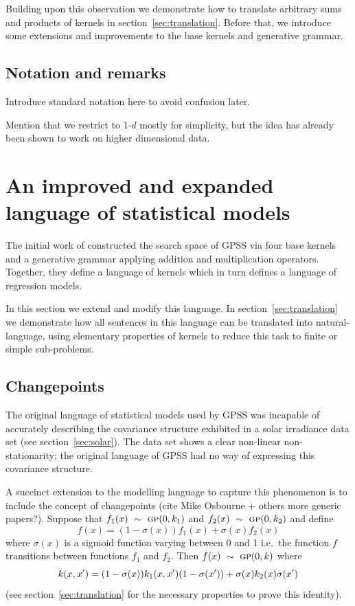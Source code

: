 \documentclass{article}
\def\ie{i.e.\ }
\begin{document}
Building upon this observation we demonstrate how to translate arbitrary sums and products of kernels in section~\ref{sec:translation}.
Before that, we introduce some extensions and improvements to the base kernels and generative grammar.

\subsection{Notation and remarks}

Introduce standard notation here to avoid confusion later.

Mention that we restrict to 1-$d$ mostly for simplicity, but the idea has already been shown to work on higher dimensional data.

\section{An improved and expanded language of statistical models}
\label{sec:improvements}

The initial work of \cite{DuvLloGroetal13} constructed the search space of GPSS via four base kernels and a generative grammar applying addition and multiplication operators.
Together, they define a language of kernels which in turn defines a language of regression models.

In this section we extend and modify this language.
In section~\ref{sec:translation} we demonstrate how all sentences in this language can be translated into natural-language, using elementary properties of kernels to reduce this task to finite or simple sub-problems.

\subsection{Changepoints}

The original language of statistical models used by GPSS was incapable of accurately describing the covariance structure exhibited in a solar irradiance data set (see section~\ref{sec:solar}).
The data set shows a clear non-linear non-stationarity; the original language of GPSS had no way of expressing this covariance structure.

A succinct extension to the modelling language to capture this phenomenon is to include the concept of changepoints (cite Mike Osbourne + others more generic papers?).
Suppose that $f_1(x) \ \sim\  {\textsc{gp}}{}(0, k_1)$ and $f_2(x) \ \sim\  {\textsc{gp}}{}(0, k_2)$ and define
\begin{equation}
f(x) = (1-\sigma(x))f_1(x) + \sigma(x)f_2(x)
\end{equation}
where $\sigma(x)$ is a sigmoid function varying between 0 and 1 \ie the function $f$ transitions between functions $f_1$ and $f_2$.
Then $f(x) \ \sim\  {\textsc{gp}}{}(0,k)$ where
\begin{equation}
\kernel(x,x') = (1-\sigma(x))k_1(x,x')(1-\sigma(x')) + \sigma(x)k_2(x)\sigma(x')
\label{eq:cp}
\end{equation}
(see section~\ref{sec:translation} for the necessary properties to prove this identity).
\end{document}
